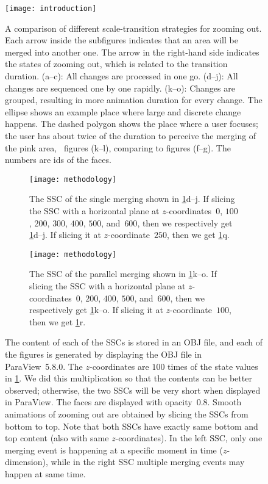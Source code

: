 \documentclass[]{interact}
\begin{document}
\begin{figure}[tb]
\centering
\texttt{[image: introduction]}
\caption{A comparison of different scale-transition strategies for zooming out.
Each arrow inside the subfigures indicates that 
an area will be merged into another one.
The arrow in the right-hand side indicates the states of zooming out,
which is related to the transition duration.
%
(a--c): All changes are processed in one go.
(d--j): All changes are sequenced one by one rapidly.
(k--o): Changes are grouped, resulting in more animation duration for every change.
%
The ellipse shows an example place where large and discrete change happens.
The dashed polygon shows the place where a user focuses;
the user has about twice of the duration 
to perceive the merging of the pink area, \ie~figures (k--l),
comparing to figures (f--g).
The numbers are ids of the faces.
}
\label{fig:intro}
\end{figure}



\begin{figure}
\centering
\begin{subfigure}[t]{0.48\textwidth}
\centering
\texttt{[image: methodology]}
\caption{The SSC of the single merging shown in \figs\ref{fig:intro}d--j.
    If slicing the SSC with a horizontal plane at $z$-coordinates~$0$, 
    $100$, $200$, $300$, $400$, $500$, and~$600$,
    then we respectively get \figs\ref{fig:intro}d--j.
    If slicing it at $z$-coordinate~$250$,
    then we get \fig\ref{fig:intro}q.}
\end{subfigure}
\hfill
\begin{subfigure}[t]{0.48\textwidth}
\centering
\texttt{[image: methodology]}
\caption{The SSC of the parallel merging shown in \figs\ref{fig:intro}k--o.    
    If slicing the SSC with a horizontal plane at $z$-coordinates~$0$, 
    $200$,  $400$, $500$, and~$600$,
    then we respectively get \figs\ref{fig:intro}k--o.
    If slicing it at $z$-coordinate~$100$,
    then we get \fig\ref{fig:intro}r.}
\end{subfigure}
\caption{
The content of each of the SSCs is stored in an OBJ file,
and each of the figures is generated by displaying the OBJ file
in ParaView~5.8.0.
The $z$-coordinates are $100$ times of the state values in \fig\ref{fig:intro}.
We did this multiplication so that the contents can be better observed;
otherwise, the two SSCs will be very short when displayed in ParaView.
The faces are displayed with opacity~$0.8$.
Smooth animations of zooming out are obtained by
slicing the SSCs from bottom to top.
Note that both SSCs have exactly same bottom and top content 
(also with same $z$-coordinates). 
In the left SSC, only one merging event is happening 
at a specific moment in time ($z$-dimension), 
while in the right SSC multiple merging events may happen at same time.
}
\label{fig:ssc}
\end{figure}
\end{document}
